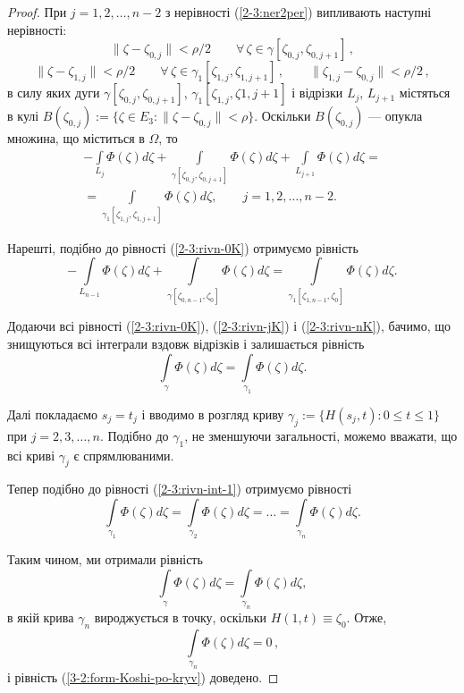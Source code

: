 \documentclass[11pt, reqno]{amsart}
\begin{document}
\begin{proof}
При $j=1,2,\ldots,n-2$ з нерівності (\ref{2-3:ner2per}) випливають наступні нерівності:
\[\|\zeta-\zeta_{0,j}\|<\rho/2 \qquad \forall\,\zeta\in\gamma[\zeta_{0,j},\zeta_{0,j+1}]\,,\]
\[\|\zeta-\zeta_{1,j}\|<\rho/2 \qquad \forall\,\zeta\in\gamma_1[\zeta_{1,j},\zeta_{1,j+1}]\,, \qquad
\|\zeta_{1,j}-\zeta_{0,j}\|<\rho/2\,,\]
в силу яких дуги $\gamma[\zeta_{0,j},\zeta_{0,j+1}]$, $\gamma_1[\zeta_{1,j},\zeta{1,j+1}]$ і відрізки
$L_j$, $L_{j+1}$ містяться в кулі $B(\zeta_{0,j}):=\{\zeta\in E_3 : \|\zeta-\zeta_{0,j}\|<\rho\}$.
Оскільки $B(\zeta_{0,j})$  --- опукла множина, що міститься в $\Omega$,
то
\begin{multline}\label{2-3:rivn-jK}
-\int\limits_{L_{j}}\Phi(\zeta)d\zeta+
\int\limits_{\gamma[\zeta_{0,j},\zeta_{0,j+1}]}\Phi(\zeta)d\zeta+\int\limits_{L_{j+1}}\Phi(\zeta)d\zeta=\\
=\int\limits_{\gamma_1[\zeta_{1,j},\zeta_{1,j+1}]}\Phi(\zeta)d\zeta,\qquad
j=1,2,\ldots,n-2.
\end{multline}

Нарешті, подібно до рівності (\ref{2-3:rivn-0K}) отримуємо рівність
\begin{equation}\label{2-3:rivn-nK}
-\int\limits_{L_{n-1}}\Phi(\zeta)d\zeta+
\int\limits_{\gamma[\zeta_{0,n-1},\zeta_{0}]}\Phi(\zeta)d\zeta=
\int\limits_{\gamma_1[\zeta_{1,n-1},\zeta_{0}]}\Phi(\zeta)d\zeta.
\end{equation}

Додаючи всі рівності (\ref{2-3:rivn-0K}), (\ref{2-3:rivn-jK}) і (\ref{2-3:rivn-nK}), бачимо, що знищуються
всі інтеграли вздовж відрізків і залишається рівність
\begin{equation}\label{2-3:rivn-int-1}
\int\limits_{\gamma}\Phi(\zeta)d\zeta=\int\limits_{\gamma_1}\Phi(\zeta)d\zeta.
\end{equation}

Далі покладаємо $s_j=t_j$ і вводимо в розгляд криву $\gamma_j:=\{H(s_j,t) : 0\leq t\leq1\}$ при $j=2,3,\ldots,n$.
Подібно до $\gamma_1$, не зменшуючи загальності, можемо вважати, що всі криві $\gamma_j$ є спрямлюваними.

Тепер подібно до рівності (\ref{2-3:rivn-int-1}) отримуємо рівності
\[\int\limits_{\gamma_1}\Phi(\zeta)d\zeta=\int\limits_{\gamma_2}\Phi(\zeta)d\zeta=\ldots=\int\limits_{\gamma_n}\Phi(\zeta)d\zeta.\]

Таким чином, ми отримали рівність
\[\int\limits_{\gamma}\Phi(\zeta)d\zeta=\int\limits_{\gamma_n}\Phi(\zeta)d\zeta,\]
в якій крива $\gamma_n$ вироджується в точку, оскільки  $H(1,t)\equiv\zeta_0$.
Отже,
\[\int\limits_{\gamma_n}\Phi(\zeta)d\zeta=0\,,\]
і рівність (\ref{3-2:form-Koshi-po-kryv}) доведено.
\end{proof}
\end{document}
